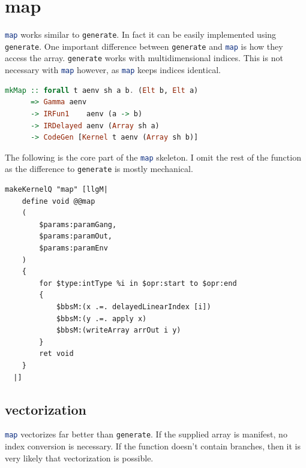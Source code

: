 \documentclass[a4paper,bibliography=totocnumbered,parskip,headsepline]{scrbook}
\begin{document}
\section{map}
\lstinline[language=haskell]!map! works similar to \lstinline[language=haskell]!generate!.
In fact it can be easily implemented using \lstinline[language=haskell]!generate!.
One important difference between \lstinline[language=haskell]!generate! and \lstinline[language=haskell]!map! is how they access the array.
\lstinline[language=haskell]!generate! works with multidimensional indices.
This is not necessary with \lstinline[language=haskell]!map! however, as \lstinline[language=haskell]!map! keeps indices identical.

\begin{lstlisting}[language=haskell]
mkMap :: forall t aenv sh a b. (Elt b, Elt a)
      => Gamma aenv
      -> IRFun1    aenv (a -> b)
      -> IRDelayed aenv (Array sh a)
      -> CodeGen [Kernel t aenv (Array sh b)]
\end{lstlisting}
The following is the core part of the \lstinline[language=haskell]!map! skeleton.
I omit the rest of the function as the difference to \lstinline[language=haskell]!generate! is mostly mechanical.
\begin{lstlisting}
makeKernelQ "map" [llgM|
    define void @@map
    (
        $params:paramGang,
        $params:paramOut,
        $params:paramEnv
    )
    {
        for $type:intType %i in $opr:start to $opr:end
        {
            $bbsM:(x .=. delayedLinearIndex [i])
            $bbsM:(y .=. apply x)
            $bbsM:(writeArray arrOut i y)
        }
        ret void
    }
  |]
\end{lstlisting}

\subsection{vectorization}
\lstinline[language=haskell]!map! vectorizes far better than \lstinline[language=haskell]!generate!.
If the supplied array is manifest, no index conversion is necessary.
If the function doesn't contain branches, then it is very likely that vectorization is possible.
\end{document}
